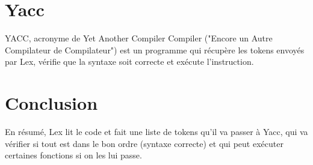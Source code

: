 \documentclass[a4paper,12pt]{article}
\begin{document}
\section{Yacc}

YACC, acronyme de Yet Another Compiler Compiler ("Encore un Autre Compilateur de Compilateur") est un programme qui récupère les tokens envoyés par Lex, vérifie que la syntaxe soit correcte et exécute l'instruction.

\section{Conclusion}

En résumé, Lex lit le code et fait une liste de tokens qu'il va passer à Yacc, qui va vérifier si tout est dans le bon ordre (syntaxe correcte) et qui peut exécuter certaines fonctions si on les lui passe.
\end{document}
